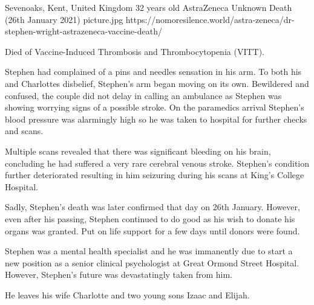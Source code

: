 {Sevenoaks, Kent, United Kingdom}
{32 years old}
{AstraZeneca}
{Unknown}
{Death (26th January 2021)}
{picture.jpg}
{https://nomoresilence.world/astra-zeneca/dr-stephen-wright-astrazeneca-vaccine-death/}
{

Died of Vaccine-Induced Thrombosis and Thrombocytopenia (VITT).

Stephen had complained of a pins and needles sensation in his arm. To both his
and Charlottes disbelief, Stephen’s arm began moving on its own. Bewildered and
confused, the couple did not delay in calling an ambulance as Stephen was
showing worrying signs of a possible stroke. On the paramedics arrival Stephen’s
blood pressure was alarmingly high so he was taken to hospital for further
checks and scans.

Multiple scans revealed that there was significant bleeding on his brain,
concluding he had suffered a very rare cerebral venous stroke. Stephen’s
condition further deteriorated resulting in him seizuring during his scans at
King’s College Hospital.

Sadly, Stephen’s death was later confirmed that day on 26th January. However,
even after his passing, Stephen continued to do good as his wish to donate his
organs was granted. Put on life support for a few days until donors were found.

Stephen was a mental health specialist and he was immanently due to start a new
position as a senior clinical psychologist at Great Ormond Street
Hospital. However, Stephen’s future was devastatingly taken from him.

He leaves his wife Charlotte and two young sons Izaac and Elijah.

}
